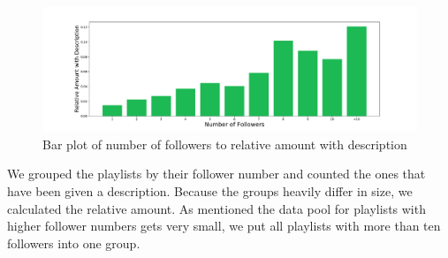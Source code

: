 \begin{figure}[ht]
    \centering
    \includegraphics[width=\textwidth]{doc/fig/followers_to_description.pdf}
    \caption{Bar plot of number of followers to relative amount with description}
    \label{fig:averagetrack}
\end{figure}

We grouped the playlists by their follower number and counted the ones that have been given a description. Because the groups heavily differ in size, we calculated the relative amount. As mentioned the data pool for playlists with higher follower numbers gets very small, we put all playlists with more than ten followers into one group.